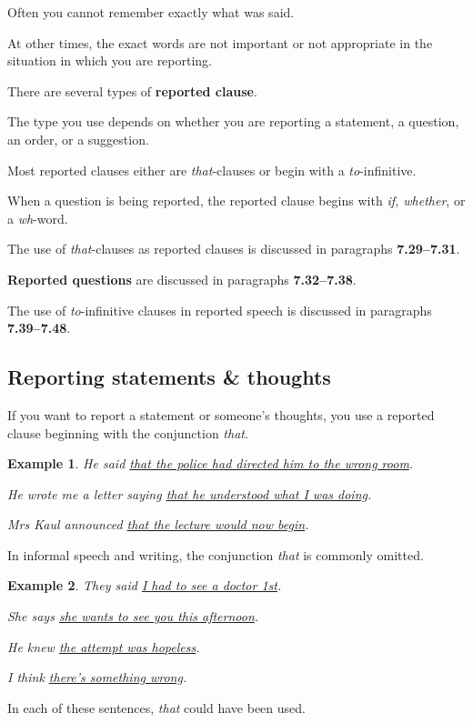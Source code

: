 \documentclass[oneside]{book}
\numberwithin{equation}{section}
\newtheorem{example}{Example}[section]
\begin{document}
Often you cannot remember exactly what was said.

At other times, the exact words are not important or not appropriate in the situation in which you are reporting.

%
\noindent{} There are several types of \textbf{reported clause}.

The type you use depends on whether you are reporting a statement, a question, an order, or a suggestion.

%
Most reported clauses either are \textit{that}-clauses or begin with a \textit{to}-infinitive.

When a question is being reported, the reported clause begins with \textit{if, whether}, or a \textit{wh}-word.

The use of \textit{that}-clauses as reported clauses is discussed in paragraphs \textbf{7.29--7.31}.

\textbf{Reported questions} are discussed in paragraphs \textbf{7.32--7.38}.

The use of \textit{to}-infinitive clauses in reported speech is discussed in paragraphs \textbf{7.39--7.48}.

\subsection{Reporting statements \& thoughts}
\noindent{} If you want to report a statement or someone's thoughts, you use a reported clause beginning with the conjunction \textit{that}.
\begin{example}
    He said \underline{that the police had directed him to the wrong room}.
    
    He wrote me a letter saying \underline{that he understood what I was doing}.
    
    Mrs Kaul announced \underline{that the lecture would now begin}.
\end{example}
In informal speech and writing, the conjunction \textit{that} is commonly omitted.
\begin{example}
    They said \underline{I had to see a doctor 1st}.
    
    She says \underline{she wants to see you this afternoon}.
    
    He knew \underline{the attempt was hopeless}.
    
    I think \underline{there's something wrong}.
\end{example}
In each of these sentences, \textit{that} could have been used.
\end{document}
